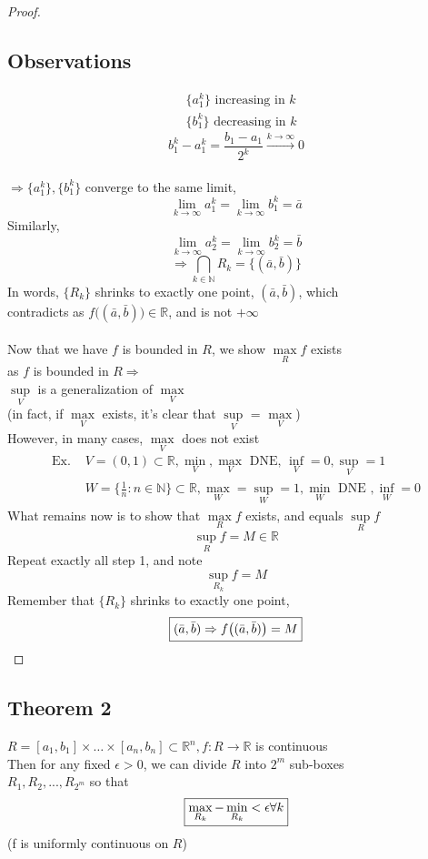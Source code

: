 \documentclass[12pt]{article}
\newcommand*\circled[1]{\tikz[baseline=(char.base)]{
    \node[shape=circle,draw,inner sep=2pt] (char) {#1};}}
\newcommand{\BR}{\mathbb R}
\newcommand{\BN}{\mathbb N}
\begin{document}
\begin{proof}
    \subsection*{Observations}
      \circled{1}
      \begin{align*}
        & \{a_1^k\}\text{ increasing in }k \\
        & \{b_1^k\}\text{ decreasing in }k
      \end{align*}
      \circled{2} \[b_1^k-a_1^k=\frac{b_1-a_1}{2^k}\xrightarrow{k\rightarrow\infty}0\]
      \\
      $\Rightarrow \{a_1^k\},\{b_1^k\}$ converge to the same limit, \\
      \[ \lim_{k\rightarrow\infty}a_1^k=\lim_{k\rightarrow\infty}b_1^k=\bar{a} \]
      Similarly,
      \[ \lim_{k\rightarrow\infty}a_2^k=\lim_{k\rightarrow\infty}b_2^k=\bar{b} \]
      \[ \Rightarrow \bigcap\limits_{k\in\BN}R_k=\big\{(\bar{a},\bar{b})\big\} \]
      In words, $\{R_k\}$ shrinks to exactly one point, $(\bar{a},\bar{b})$, which \\
      contradicts as $f\big((\bar{a},\bar{b})\big)\in\BR$, and is not $+\infty$ \\
      \\
      Now that we have $f$ is bounded in $R$, we show $\max\limits_Rf$ exists \\
      as $f$ is bounded in $R\Rightarrow$  \\
      $\sup\limits_V$ is a generalization of $\max\limits_V$ \\
      (in fact, if $\max\limits_V$ exists, it's clear that $\sup\limits_V$ = $\max\limits_V$) \\
      However, in many cases, $\max\limits_V$ does not exist \\
      \begin{align*}
        \text{Ex. } & V=(0,1)\subset\BR,\min_V,\max_V\text{ DNE, }\inf_V=0,\sup_V=1 \\
        & W = \big\{\frac{1}{n}:n\in\BN\big\}\subset\BR,\max_W=\sup_W=1,\min_W\text{ DNE },\inf_W=0
      \end{align*}
      What remains now is to show that $\max\limits_Rf$ exists, and equals $\sup\limits_Rf$ \\
      \[ \sup_Rf=M\in\BR \]
      Repeat exactly all step 1, and note \\
      \[ \sup_{R_k}f=M \]
      Remember that $\{R_k\}$ shrinks to exactly one point, \\
      \[ \fbox{$(\bar{a},\bar{b})\Rightarrow f\big((\bar{a},\bar{b})\big)=M$} \]
  \end{proof}
\subsection*{Theorem 2}
  $R=[a_1,b_1]\times\dots\times[a_n,b_n]\subset\BR^n,f:R\rightarrow\BR$ is continuous \\
  Then for any fixed $\epsilon>0$, we can divide $R$ into $2^m$ sub-boxes \\
  $R_1,R_2,...,R_{2^m}$ so that \\
  \[ \fbox{$\max\limits_{R_k}-\min\limits_{R_k}<\epsilon\forall k$} \]
  (f is uniformly continuous on $R$)
\end{document}
